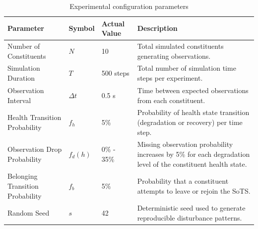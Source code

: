 \begin{table}[htp]
\centering
\caption{Experimental configuration parameters}
\label{tab:experiment-config}
\small
\begin{tabular}{p{4cm}p{2cm}p{2.5cm}p{6cm}}
\toprule
\textbf{Parameter} & \textbf{Symbol} & \textbf{Actual Value} & \textbf{Description} \\
\midrule

Number of Constituents & $N$ & 10 & Total simulated constituents generating observations. \\

Simulation Duration & $T$ & 500 steps & Total number of simulation time steps per experiment. \\

Observation Interval & $\Delta t$ & 0.5 s & Time between expected observations from each constituent. \\

Health Transition Probability & $f_h$ & 5\% & Probability of health state transition (degradation or recovery) per time step. \\

Observation Drop Probability & $f_d(h)$ & 0\% - 35\% & Missing observation probability increases by 5\% for each degradation level of the constituent health state. \\

Belonging Transition Probability & $f_b$ & 5\% & Probability that a constituent attempts to leave or rejoin the SoTS. \\

Random Seed & $s$ & 42 & Deterministic seed used to generate reproducible disturbance patterns. \\

\bottomrule
\end{tabular}
\end{table}